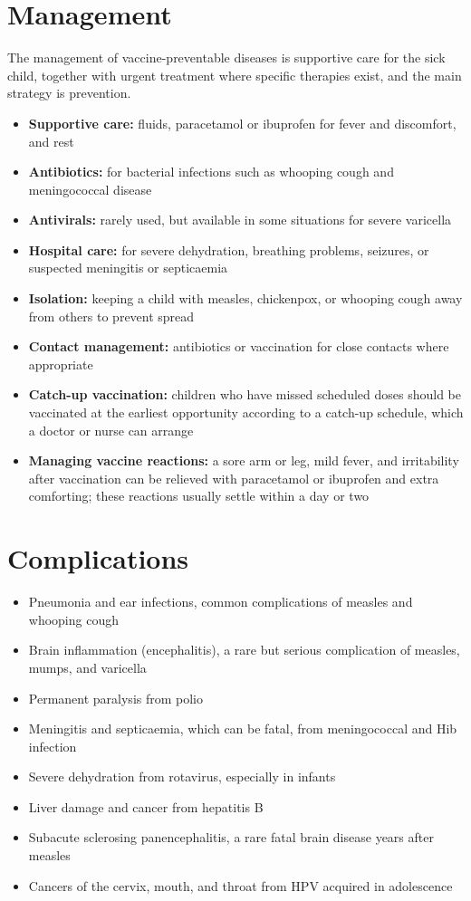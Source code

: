 \section*{Management}
The management of vaccine-preventable diseases is supportive care for the sick child, together with urgent treatment where specific therapies exist, and the main strategy is prevention.

\begin{itemize}
    \item \textbf{Supportive care:} fluids, paracetamol or ibuprofen for fever and discomfort, and rest
    \item \textbf{Antibiotics:} for bacterial infections such as whooping cough and meningococcal disease
    \item \textbf{Antivirals:} rarely used, but available in some situations for severe varicella
    \item \textbf{Hospital care:} for severe dehydration, breathing problems, seizures, or suspected meningitis or septicaemia
    \item \textbf{Isolation:} keeping a child with measles, chickenpox, or whooping cough away from others to prevent spread
    \item \textbf{Contact management:} antibiotics or vaccination for close contacts where appropriate
    \item \textbf{Catch-up vaccination:} children who have missed scheduled doses should be vaccinated at the earliest opportunity according to a catch-up schedule, which a doctor or nurse can arrange
    \item \textbf{Managing vaccine reactions:} a sore arm or leg, mild fever, and irritability after vaccination can be relieved with paracetamol or ibuprofen and extra comforting; these reactions usually settle within a day or two
\end{itemize}

\section*{Complications}
\begin{itemize}
    \item Pneumonia and ear infections, common complications of measles and whooping cough
    \item Brain inflammation (encephalitis), a rare but serious complication of measles, mumps, and varicella
    \item Permanent paralysis from polio
    \item Meningitis and septicaemia, which can be fatal, from meningococcal and Hib infection
    \item Severe dehydration from rotavirus, especially in infants
    \item Liver damage and cancer from hepatitis B
    \item Subacute sclerosing panencephalitis, a rare fatal brain disease years after measles
    \item Cancers of the cervix, mouth, and throat from HPV acquired in adolescence
\end{itemize}

